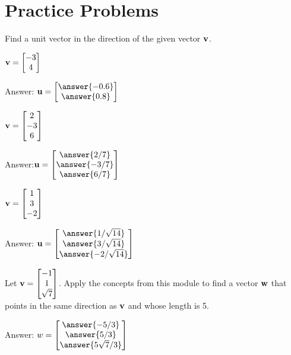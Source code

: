 \documentclass{ximera}
\begin{document}
\section*{Practice Problems}
\begin{problem}
    Find a unit vector in the direction of the given vector ${\bf v}$.
  \begin{problem}
  ${\bf v}=\begin{bmatrix}-3\\4\end{bmatrix}$

  Answer: $\vec{u}=\begin{bmatrix}\answer{-0.6}\\\answer{0.8}\end{bmatrix}$
  \end{problem}
  \begin{problem}
      ${\bf v}=\begin{bmatrix}2\\-3\\6\end{bmatrix}$

Answer:$\vec{u}=\begin{bmatrix}\answer{2/7}\\\answer{-3/7}\\\answer{6/7}\end{bmatrix}$
   \end{problem}
   \begin{problem}
        ${\bf v}=\begin{bmatrix}1\\3\\-2\end{bmatrix}$

 Answer: $\vec{u}=\begin{bmatrix}\answer{1/\sqrt{14}}\\\answer{3/\sqrt{14}}\\\answer{-2/\sqrt{14}}\end{bmatrix}$       
  \end{problem}
\end{problem}  
\begin{problem}
Let ${\bf v}=\begin{bmatrix}-1\\1\\\sqrt{7}\end{bmatrix}$.
Apply the concepts from this module to find a vector ${\bf w}$ that points in the same direction as ${\bf v}$ and whose length is 5.

Answer: $w=\begin{bmatrix}
    \answer{-5/3}\\\answer{5/3}\\\answer{5\sqrt{7}/3}
\end{bmatrix}$
\end{problem}
\end{document}
